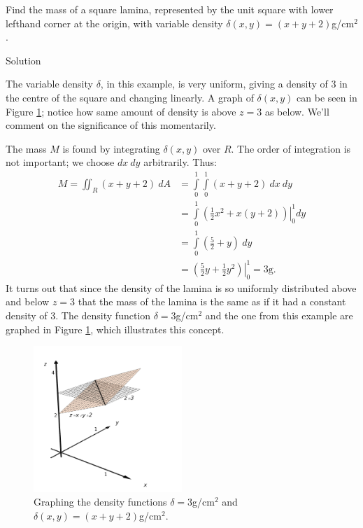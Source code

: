 \begin{example}\label{ex_mass2}
Find the mass of a square lamina, represented by the unit square with lower lefthand corner at the origin, with variable density $\delta(x,y) = (x+y+2)$g/cm$^2$.

Solution 

The variable density $\delta$, in this example, is very uniform, giving a density of 3 in the centre of the square and changing linearly. A graph of $\delta(x,y)$ can be seen in Figure \ref{fig_double_16}; notice how same amount of density is above $z=3$ as below. We'll comment on the significance of this momentarily.

The mass $M$ is found by integrating $\delta(x,y)$ over $R$. The order of integration is not important; we choose $dx\ dy$ arbitrarily. Thus:
\allowdisplaybreaks
\begin{align*}
M = \iint_R(x+y+2)\ dA &= \int\limits_0^1\int\limits_0^1 (x+y+2)\ dx\ dy\\
		&= \int\limits_0^1\left.\left(\frac 12x^2+x(y+2)\right)\right|_0^1dy\\
		&= \int\limits_0^1 \left(\frac52+y\right)\ dy\\
		&= \left.\left(\frac52y+\frac12y^2\right)\right|_0^1=3\text{g}.
\end{align*}
It turns out that since the density of the lamina is so uniformly distributed above and below $z=3$ that the mass of the lamina is the same as if it had a constant density of 3. The density function $\delta=3$g/cm$^2$ and the one from this example are graphed in Figure \ref{fig_double_16}, which illustrates this concept.

\begin{figure}[H]
	\begin{center}
			\includegraphics[width=0.5\textwidth]{fig_double_16}
	\caption{Graphing the density functions $\delta=3$g/cm$^2$ and $\delta(x,y) = (x+y+2)$g/cm$^2$.}
	\label{fig_double_16}
	\end{center}
\end{figure}


\end{example}

